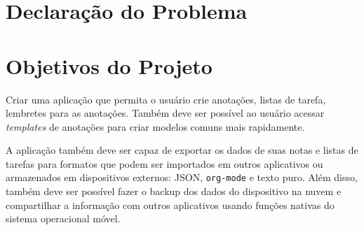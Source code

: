 \documentclass[
	12pt,				%
	oneside,			%
	a4paper,			%
	english,			%
	brazil,				%
	]{abntex2}
\begin{document}
\section{Declaração do Problema}

\begin{table}[ht]
\end{table}

\section{Objetivos do Projeto}
Criar uma aplicação que permita o usuário crie anotações, listas de tarefa, lembretes para as anotações. Também deve ser possível ao usuário acessar \textit{templates} de anotações para criar modelos comuns mais rapidamente.

A aplicação também deve ser capaz de exportar os dados de suas notas e listas de tarefas para formatos que podem ser importados em outros aplicativos ou armazenados em dispositivos externos: JSON, \texttt{org-mode} e texto puro. Além disso, também deve ser possível fazer o backup dos dados do dispositivo na nuvem e compartilhar a informação com outros aplicativos usando funções nativas do sistema operacional móvel.
\end{document}
